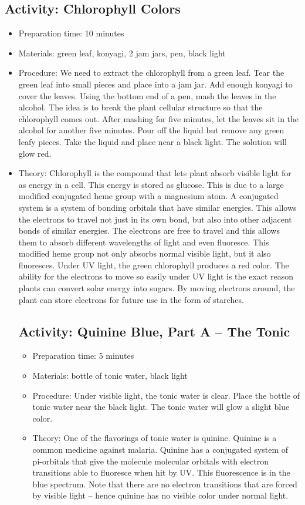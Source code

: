 \subsection{Activity: Chlorophyll Colors}
\begin{itemize}
\item{Preparation time: 10 minutes}
\item{Materials: green leaf, konyagi, 2 jam jars, pen, black light}
\item{Procedure: We need to extract the chlorophyll from a green leaf. Tear the green leaf into small pieces and place into a jam jar. Add enough konyagi to cover the leaves. Using the bottom end of a pen, mash the leaves in the alcohol. The idea is to break the plant cellular structure so that the chlorophyll comes out. After mashing for five minutes, let the leaves sit in the alcohol for another five minutes. Pour off the liquid but remove any green leafy pieces. Take the liquid and place near a black light. The solution will glow red.}
\item{Theory: Chlorophyll is the compound that lets plant absorb visible light for as energy in a cell. This energy is stored as glucose. This is due to a large modified conjugated heme group with a magnesium atom. A conjugated system is a system of bonding orbitals that have similar energies. This allows the electrons to travel not just in its own bond, but also into other adjacent bonds of similar energies. The electrons are free to travel and this allows them to absorb different wavelengths of light and even fluoresce. This modified heme group not only absorbs normal visible light, but it also fluoresces. Under UV light, the green chlorophyll produces a red color. The ability for the electrons to move so easily under UV light is the exact reason plants can convert solar energy into sugars. By moving electrons around, the plant can store electrons for future use in the form of starches.

\subsection{Activity: Quinine Blue, Part A – The Tonic}
\begin{itemize}
\item{Preparation time: 5 minutes}
\item{Materials: bottle of tonic water, black light}
\item{Procedure: Under visible light, the tonic water is clear. Place the bottle of tonic water near the black light. The tonic water will glow a slight blue color.}
\item{Theory: One of the flavorings of tonic water is quinine. Quinine is a common medicine against malaria. Quinine has a conjugated system of pi-orbitals that give the molecule molecular orbitals with electron transitions able to fluoresce when hit by UV. This fluorescence is in the blue spectrum. Note that there are no electron transitions that are forced by visible light – hence quinine has no visible color under normal light.}
\end{itemize}

}
\end{itemize}
